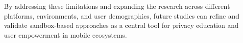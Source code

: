 \documentclass[acmlarge, nonacm]{acmart}
\begin{document}
By addressing these limitations and expanding the research across different platforms, environments, and user demographics, future studies can refine and validate sandbox-based approaches as a central tool for privacy education and user empowerment in mobile ecosystems.








\end{document}
